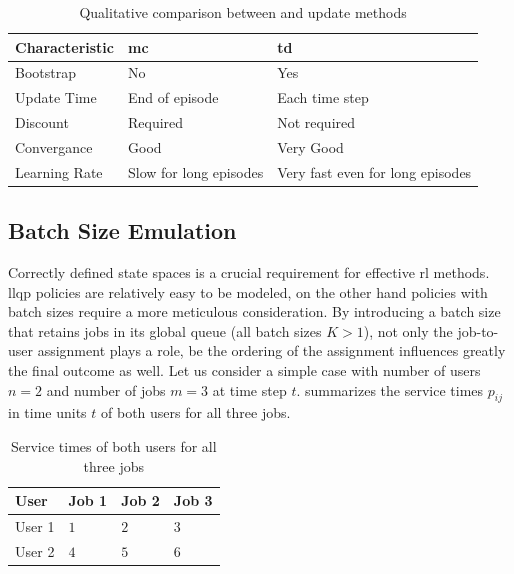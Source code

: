 \begin{table}[!ht]
	\centering
		\begin{tabular}{@{}lll@{}}
		\toprule
		Characteristic & \gls{mc}                     & \gls{td}                               \\ \midrule
		Bootstrap      & No                     & Yes                              \\
		Update Time    & End of episode         & Each time step                   \\
		Discount       & Required               & Not required                     \\
		Convergance    & Good                   & Very Good                        \\
		Learning Rate  & Slow for long episodes & Very fast even for long episodes \\ \bottomrule
		\end{tabular}
	\caption{Qualitative comparison between  and  update methods \citep[p. 130]{Sutton2017}}
	\label{tab:mc_td_comp}
\end{table}

\subsection{Batch Size Emulation}
\label{subsec:batch_size_emulation}

Correctly defined state spaces is a crucial requirement for effective \gls{rl} methods. \gls{llqp} policies are relatively easy to be modeled, on the other hand policies with batch sizes require a more meticulous consideration. By introducing a batch size that retains jobs in its global queue (\ie all batch sizes $K>1$), not only the job-to-user assignment plays a role, be the ordering of the assignment influences greatly the final outcome as well. Let us consider a simple case with number of users $n=2$ and number of jobs $m=3$ at time step $t$.  summarizes the service times $p_{ij}$ in time units $t$ of both users for all three jobs.

\begin{table}[!ht]
	\centering
		\begin{tabular}{@{}llll@{}}
		\toprule
		User   & Job 1 & Job 2 & Job 3 \\ \midrule
		User 1 & $1$     & $2$     & $3$     \\
		User 2 & $4$     & $5$     & $6$     \\ \bottomrule
		\end{tabular}
	\caption{Service times of both users for all three jobs}
	\label{tab:users_service_times_example}
\end{table}

